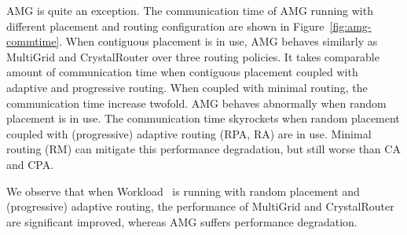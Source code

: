 AMG is quite an exception. 
The communication time of AMG running with different placement and routing configuration are shown in Figure~\ref{fig:amg-commtime}.
When contiguous placement is in use, AMG behaves similarly as MultiGrid and CrystalRouter over three routing policies. 
It takes comparable amount of communication time when contiguous placement coupled with adaptive and progressive routing. 
When coupled with minimal routing, the communication time increase twofold. 
AMG behaves abnormally when random placement is in use. 
The communication time skyrockets when random placement coupled with (progressive) adaptive routing (RPA, RA) are in use. Minimal routing (RM) can mitigate this performance degradation, but still worse than CA and CPA.

We observe that when Workload~ is running with random placement and (progressive) adaptive routing, the performance of MultiGrid and CrystalRouter are significant improved, whereas AMG suffers performance degradation. 


